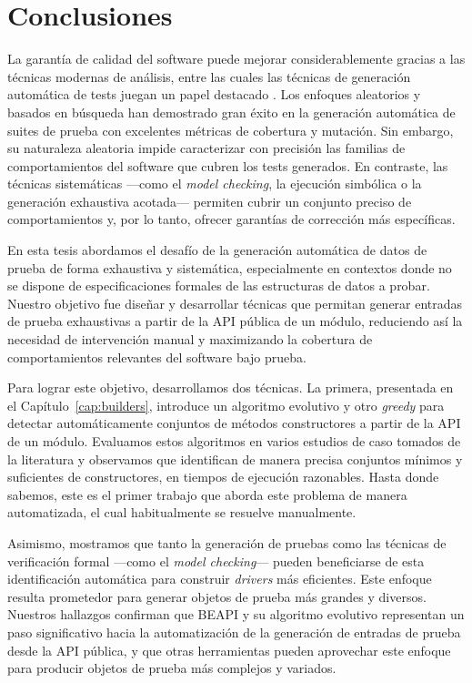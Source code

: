 \chapter{Conclusiones}
\label{cap:conclutions}

La garantía de calidad del software puede mejorar considerablemente gracias a las técnicas modernas de análisis, 
entre las cuales las técnicas de generación automática de tests juegan un papel destacado \cite{Cadar08, Luckow14, Fraser11, Pacheco07, Ma15, goGodefroid05, Marinov01, Boyapati02,Godefroid12}. 
Los enfoques aleatorios y basados en búsqueda han demostrado gran éxito en la generación automática de suites de prueba con excelentes métricas de cobertura y mutación. 
Sin embargo, su naturaleza aleatoria impide caracterizar con precisión las familias de comportamientos del software que cubren los tests generados. 
En contraste, las técnicas sistemáticas —como el \emph{model checking}, la ejecución simbólica o la generación exhaustiva acotada— permiten cubrir un conjunto preciso de comportamientos 
y, por lo tanto, ofrecer garantías de corrección más específicas.

En esta tesis abordamos el desafío de la generación automática de datos de prueba de forma exhaustiva y sistemática, 
especialmente en contextos donde no se dispone de especificaciones formales de las estructuras de datos a probar. 
Nuestro objetivo fue diseñar y desarrollar técnicas que permitan generar entradas de prueba exhaustivas a partir de la API pública de un módulo, 
reduciendo así la necesidad de intervención manual y maximizando la cobertura de comportamientos relevantes del software bajo prueba.

Para lograr este objetivo, desarrollamos dos técnicas. La primera, presentada en el Capítulo~\ref{cap:builders}, 
introduce un algoritmo evolutivo y otro \emph{greedy} para detectar automáticamente conjuntos de métodos constructores a partir de la API de un módulo. 
Evaluamos estos algoritmos en varios estudios de caso tomados de la literatura y observamos que identifican de manera precisa conjuntos mínimos y suficientes de constructores, 
en tiempos de ejecución razonables. Hasta donde sabemos, este es el primer trabajo que aborda este problema de manera automatizada, 
el cual habitualmente se resuelve manualmente.

Asimismo, mostramos que tanto la generación de pruebas como las técnicas de verificación formal —como el \emph{model checking}— 
pueden beneficiarse de esta identificación automática para construir \emph{drivers} más eficientes. 
Este enfoque resulta prometedor para generar objetos de prueba más grandes y diversos. 
Nuestros hallazgos confirman que BEAPI y su algoritmo evolutivo representan un paso significativo hacia la automatización 
de la generación de entradas de prueba desde la API pública, y que otras herramientas pueden aprovechar este enfoque 
para producir objetos de prueba más complejos y variados.

